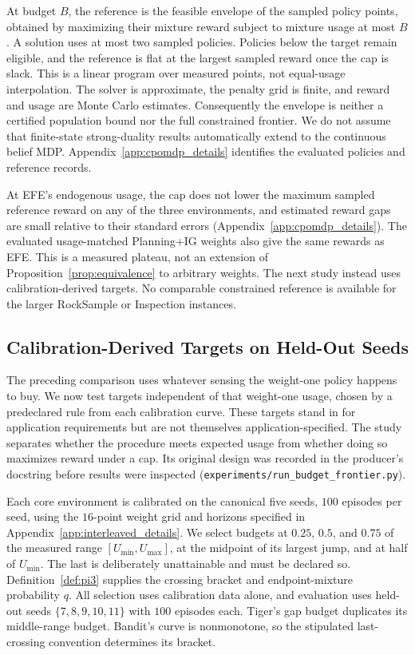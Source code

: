 \documentclass[runningheads]{llncs}
\begin{document}
At budget $B$, the reference is the feasible envelope of the sampled policy points, obtained by maximizing their mixture reward subject to mixture usage at most $B$. A solution uses at most two sampled policies. Policies below the target remain eligible, and the reference is flat at the largest sampled reward once the cap is slack. This is a linear program over measured points, not equal-usage interpolation. The solver is approximate, the penalty grid is finite, and reward and usage are Monte Carlo estimates. Consequently the envelope is neither a certified population bound nor the full constrained frontier. We do not assume that finite-state strong-duality results \citep{altman1999} automatically extend to the continuous belief MDP. Appendix~\ref{app:cpomdp_details} identifies the evaluated policies and reference records.

At EFE's endogenous usage, the cap does not lower the maximum sampled reference reward on any of the three environments, and estimated reward gaps are small relative to their standard errors (Appendix~\ref{app:cpomdp_details}). The evaluated usage-matched Planning+IG weights also give the same rewards as EFE. This is a measured plateau, not an extension of Proposition~\ref{prop:equivalence} to arbitrary weights. The next study instead uses calibration-derived targets. No comparable constrained reference is available for the larger RockSample or Inspection instances.

\subsection{Calibration-Derived Targets on Held-Out Seeds}
\label{sec:budget_frontier}

The preceding comparison uses whatever sensing the weight-one policy happens to buy. We now test targets independent of that weight-one usage, chosen by a predeclared rule from each calibration curve. These targets stand in for application requirements but are not themselves application-specified. The study separates whether the procedure meets expected usage from whether doing so maximizes reward under a cap. Its original design was recorded in the producer's docstring before results were inspected (\texttt{experiments/\allowbreak run\_\allowbreak budget\_\allowbreak frontier.py}).

Each core environment is calibrated on the canonical five seeds, $100$ episodes per seed, using the $16$-point weight grid and horizons specified in Appendix~\ref{app:interleaved_details}. We select budgets at $0.25$, $0.5$, and $0.75$ of the measured range $[U_{\min},U_{\max}]$, at the midpoint of its largest jump, and at half of $U_{\min}$. The last is deliberately unattainable and must be declared so. Definition~\ref{def:pi3} supplies the crossing bracket and endpoint-mixture probability $q$. All selection uses calibration data alone, and evaluation uses held-out seeds $\{7,8,9,10,11\}$ with $100$ episodes each. Tiger's gap budget duplicates its middle-range budget. Bandit's curve is nonmonotone, so the stipulated last-crossing convention determines its bracket.
\end{document}
